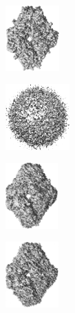 \begin{figure}[t]
    \vspace{1em}
    \begin{subfigure}[b]{0.17\linewidth}
        \centering
        \includegraphics[height=2.5cm]{figures/5a1a_quartercov_uniformS2_noise0_gt_.png}
        \caption{}\label{fig:5a1a-noise0-reconstruction-true}
    \end{subfigure}
    \hfill
    \begin{subfigure}[b]{0.16\linewidth}
        \centering
        \includegraphics[height=2.5cm]{figures/5a1a_quartercov_uniformS2_noise0_rand.png}
        \caption{}
    \end{subfigure}
    \hfill
    \begin{subfigure}[b]{0.15\linewidth}
        \centering
        \includegraphics[height=2.5cm]{figures/5a1a_quartercov_uniformS2_noise0_apr_.png}
        \caption{}\label{fig:5a1a-noise0-reconstruction-recovered}
    \end{subfigure}
    \hfill
    \begin{subfigure}[b]{0.15\linewidth}
        \centering
        \includegraphics[height=2.5cm]{figures/5a1a_quartercov_uniformS2_noise16_apr_.png}
        \caption{}\label{fig:5a1a-noise16-reconstruction-recovered}
    \end{subfigure}
    \hfill
    \begin{subfigure}[b]{0.30\linewidth}

\end{subfigure}
\end{figure}
